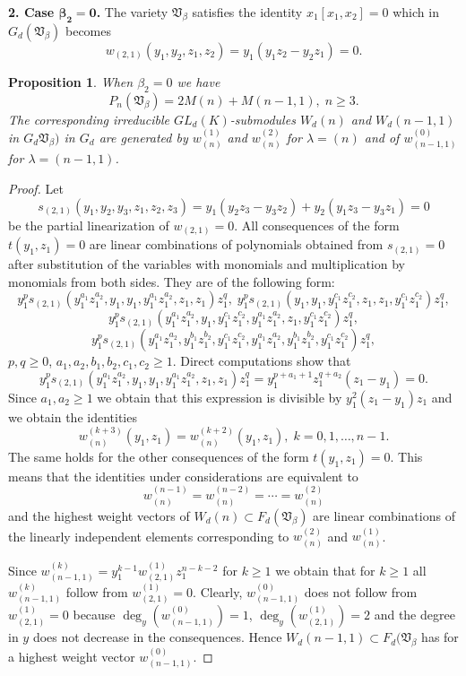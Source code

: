 \documentclass{amsart}
\newtheorem{proposition}[theorem]{Proposition}
\theoremstyle{definition}
\begin{document}
{\bf 2. Case $\bm{\beta_2=0}$.} The variety ${\mathfrak V}_{\beta}$ satisfies the identity $x_1[x_1,x_2]=0$ which in $G_d({\mathfrak V}_{\beta})$ becomes
\[
w_{(2,1)}(y_1,y_2,z_1,z_2)=y_1(y_1z_2-y_2z_1)=0.
\]

\begin{proposition}\label{chi for beta2=0}
When $\beta_2=0$ we have
\[
P_n({\mathfrak V}_{\beta})=2M(n)+M(n-1,1),\; n\geq 3.
\]
The corresponding irreducible $GL_d(K)$-submodules $W_d(n)$ and $W_d(n-1,1)$ in $G_d{\mathfrak V}_{\beta})$ in $G_d$ are generated by
$w_{(n)}^{(1)}$ and $w_{(n)}^{(2)}$ for $\lambda=(n)$ and of $w_{(n-1,1)}^{(0)}$ for $\lambda=(n-1,1)$.
\end{proposition}

\begin{proof}
Let
\[
s_{(2,1)}(y_1,y_2,y_3,z_1,z_2,z_3)=y_1(y_2z_3-y_3z_2)+y_2(y_1z_3-y_3z_1)=0
\]
be the partial linearization of $w_{(2,1)}=0$. All consequences of the form $t(y_1,z_1)=0$ are linear combinations of
polynomials obtained from $s_{(2,1)}=0$ after substitution of the variables with monomials and multiplication by monomials from both sides.
They are of the following form:
\[
y_1^ps_{(2,1)}(y_1^{a_1}z_1^{a_2},y_1,y_1,y_1^{a_1}z_1^{a_2},z_1,z_1)z_1^q,\; y_1^ps_{(2,1)}(y_1,y_1,y_1^{c_1}z_1^{c_2},z_1,z_1,y_1^{c_1}z_1^{c_2})z_1^q,
\]
\[
y_1^ps_{(2,1)}(y_1^{a_1}z_1^{a_2},y_1,y_1^{c_1}z_1^{c_2},y_1^{a_1}z_1^{a_2},z_1,y_1^{c_1}z_1^{c_2})z_1^q,
\]
\[
y_1^ps_{(2,1)}(y_1^{a_1}z_1^{a_2},y_1^{b_1}z_1^{b_2},y_1^{c_1}z_1^{c_2},y_1^{a_1}z_1^{a_2},y_1^{b_1}z_1^{b_2},y_1^{c_1}z_1^{c_2})z_1^q,
\]
$p,q\geq 0$, $a_1,a_2,b_1,b_2,c_1,c_2\geq 1$.
Direct computations show that
\[
y_1^ps_{(2,1)}(y_1^{a_1}z_1^{a_2},y_1,y_1,y_1^{a_1}z_1^{a_2},z_1,z_1)z_1^q=y_1^{p+a_1+1}z_1^{q+a_2}(z_1-y_1)=0.
\]
Since $a_1,a_2\geq 1$ we obtain that this expression is divisible by $y_1^2(z_1-y_1)z_1$ and we obtain the identities
\[
w_{(n)}^{(k+3)}(y_1,z_1)=w_{(n)}^{(k+2)}(y_1,z_1),\;k=0,1,\ldots,n-1.
\]
The same holds for the other consequences of the form $t(y_1,z_1)=0$. This means that the identities under considerations are equivalent to
\[
w_{(n)}^{(n-1)}=w_{(n)}^{(n-2)}=\cdots=w_{(n)}^{(2)}
\]
and the highest weight vectors of $W_d(n)\subset F_d({\mathfrak V}_{\beta})$ are linear combinations of the linearly independent elements
corresponding to $w_{(n)}^{(2)}$ and $w_{(n)}^{(1)}$.

Since $w_{(n-1,1)}^{(k)}=y_1^{k-1}w_{(2,1)}^{(1)}z_1^{n-k-2}$ for $k\geq 1$ we obtain that for $k\geq 1$ all $w_{(n-1,1)}^{(k)}$ follow from $w_{(2,1)}^{(1)}=0$.
Clearly, $w_{(n-1,1)}^{(0)}$ does not follow from $w_{(2,1)}^{(1)}=0$ because $\deg_y(w_{(n-1,1)}^{(0)})=1$, $\deg_y(w_{(2,1)}^{(1)})=2$
and the degree in $y$ does not decrease in the consequences. Hence $W_d(n-1,1)\subset F_d({\mathfrak V}_{\beta}$ has for a highest weight vector $w_{(n-1,1)}^{(0)}$.
\end{proof}
\end{document}
